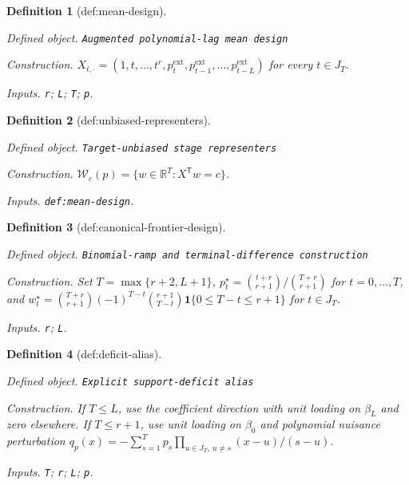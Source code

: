 \documentclass{article}
\newtheorem{definition}{Definition}
\begin{document}
\begin{definition}[def:mean-design]\label{def:mean-design}
\par\smallskip\noindent\emph{Defined object.} \texttt{Augmented polynomial-\allowbreak{}lag mean design}
\par\smallskip\noindent\emph{Construction.} \(X_{t,\cdot}=(1,t,\ldots,t^r,p^{\mathrm{ext}}_t,p^{\mathrm{ext}}_{t-1},\ldots,p^{\mathrm{ext}}_{t-L})\) for every \(t\in J_T\).
\par\smallskip\noindent\emph{Inputs.} \texttt{r}; \texttt{L}; \texttt{T}; \texttt{p}.
\end{definition}

\begin{definition}[def:unbiased-representers]\label{def:unbiased-representers}
\par\smallskip\noindent\emph{Defined object.} \texttt{Target-\allowbreak{}unbiased stage representers}
\par\smallskip\noindent\emph{Construction.} \(\mathcal W_c(p)=\{w\in\mathbb R^T:X^{\mathsf T}w=c\}\).
\par\smallskip\noindent\emph{Inputs.} \texttt{def:\allowbreak{}mean-\allowbreak{}design}.
\end{definition}

\begin{definition}[def:canonical-frontier-design]\label{def:canonical-frontier-design}
\par\smallskip\noindent\emph{Defined object.} \texttt{Binomial-\allowbreak{}ramp and terminal-\allowbreak{}difference construction}
\par\smallskip\noindent\emph{Construction.} Set \(T=\max\{r+2,L+1\}\), \(p_t^\star=\binom{t+r}{r+1}/\binom{T+r}{r+1}\) for \(t=0,\ldots,T\), and \(w_t^\star=\binom{T+r}{r+1}(-1)^{T-t}\binom{r+1}{T-t}\mathbf 1\{0\le T-t\le r+1\}\) for \(t\in J_T\).
\par\smallskip\noindent\emph{Inputs.} \texttt{r}; \texttt{L}.
\end{definition}

\begin{definition}[def:deficit-alias]\label{def:deficit-alias}
\par\smallskip\noindent\emph{Defined object.} \texttt{Explicit support-\allowbreak{}deficit alias}
\par\smallskip\noindent\emph{Construction.} If \(T\le L\), use the coefficient direction with unit loading on \(\beta_L\) and zero elsewhere. If \(T\le r+1\), use unit loading on \(\beta_0\) and polynomial nuisance perturbation \(q_p(x)=-\sum_{s=1}^{T}p_s\prod_{u\in J_T,\ u\ne s}(x-u)/(s-u)\).
\par\smallskip\noindent\emph{Inputs.} \texttt{T}; \texttt{r}; \texttt{L}; \texttt{p}.
\end{definition}
\end{document}
